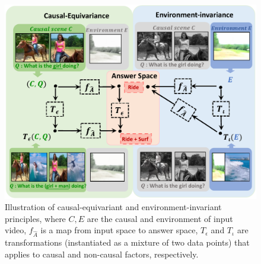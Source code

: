 \begin{figure}[t]
\centering
\includegraphics[scale=0.47]{fig/f1.pdf}
\caption{Illustration of causal-equivariant and environment-invariant principles, where $C,E$ are the causal and environment of input video, $f_{\hat{A}}$ is a map from input space to answer space, $T_{\epsilon}$ and $T_{\iota}$ are transformations (instantiated as a mixture of two data points) that applies to causal and non-causal factors, respectively.}
\vspace{-18pt}
\label{fig:overview}
\end{figure}






